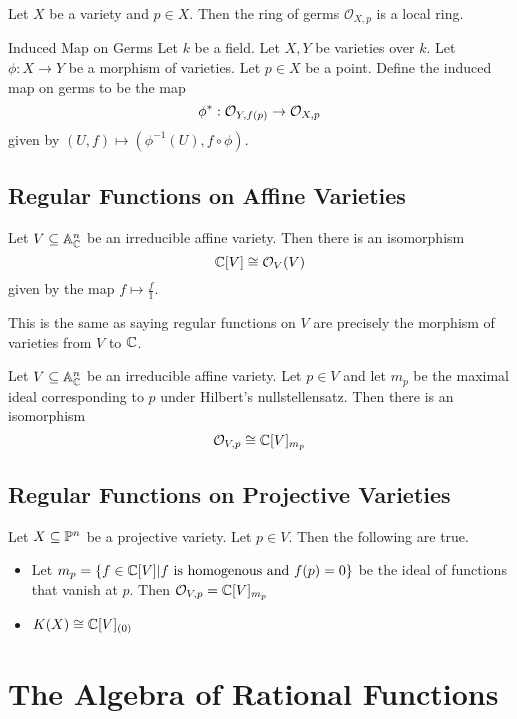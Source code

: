 \documentclass[a4paper]{article}
\begin{document}
\begin{prp}{}{} Let $X$ be a variety and $p\in X$. Then the ring of germs $\mathcal{O}_{X,p}$ is a local ring. 
\end{prp}

\begin{defn}{Induced Map on Germs}{} Let $k$ be a field. Let $X,Y$ be varieties over $k$. Let $\phi:X\to Y$ be a morphism of varieties. Let $p\in X$ be a point. Define the induced map on germs to be the map $$\phi^\ast:\mathcal{O}_{Y,f(p)}\to\mathcal{O}_{X,p}$$ given by $(U,f)\mapsto(\phi^{-1}(U),f\circ\phi)$. 
\end{defn}

\subsection{Regular Functions on Affine Varieties}
\begin{prp}{}{} Let $V\subseteq\mathbb{A}_{\mathbb{C}}^n$ be an irreducible affine variety. Then there is an isomorphism $$\mathbb{C}[V]\cong\mathcal{O}_V(V)$$ given by the map $f\mapsto\frac{f}{1}$. 
\end{prp}

This is the same as saying regular functions on $V$ are precisely the morphism of varieties from $V$ to $\mathbb{C}$. 

\begin{prp}{}{} Let $V\subseteq\mathbb{A}_{\mathbb{C}}^n$ be an irreducible affine variety. Let $p\in V$ and let $m_p$ be the maximal ideal corresponding to $p$ under Hilbert's nullstellensatz. Then there is an isomorphism $$\mathcal{O}_{V,p}\cong\mathbb{C}[V]_{m_p}$$
\end{prp}

\subsection{Regular Functions on Projective Varieties}
\begin{thm}{}{} Let $X\subseteq\mathbb{P}^n$ be a projective variety. Let $p\in V$. Then the following are true. 
\begin{itemize}
\item Let $m_p=\{f\in\mathbb{C}[V]|f\text{ is homogenous and }f(p)=0\}$ be the ideal of functions that vanish at $p$. Then $\mathcal{O}_{V,p}=\mathbb{C}[V]_{m_p}$
\item $K(X)\cong\mathbb{C}[V]_{(0)}$
\end{itemize}
\end{thm}

\pagebreak
\section{The Algebra of Rational Functions}
\end{document}
